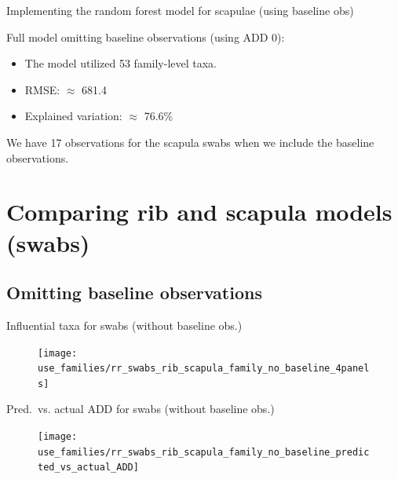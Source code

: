 \documentclass{beamer}
\begin{document}
\begin{frame}{Implementing the random forest model for scapulae (using baseline obs)}

  \noindent Full model omitting baseline observations (using ADD 0):
  \begin{itemize}
    \item The model utilized 53 family-level taxa. 
    \item RMSE: $\approx$ 681.4
    \item Explained variation: $\approx$ 76.6\%
  \end{itemize}
  \vspace{0.1in}

  \noindent We have 17 observations for the scapula swabs when we include the
  baseline observations.

\end{frame}



\section[Swabs from ribs and scapulae]{Comparing rib and scapula models (swabs)}


\subsection[No baseline]{Omitting baseline observations}

\begin{frame}{Influential taxa for swabs (without baseline obs.)}

  \begin{center}
    \begin{figure}
      \texttt{[image: use\_families/rr\_swabs\_rib\_scapula\_family\_no\_baseline\_4panels]}
    \end{figure}
  \end{center}

\end{frame}


\begin{frame}{Pred.\ vs. actual ADD for swabs (without baseline obs.)}

  \begin{center}
    \begin{figure}
      \texttt{[image: use\_families/rr\_swabs\_rib\_scapula\_family\_no\_baseline\_predicted\_vs\_actual\_ADD]}
    \end{figure}
  \end{center}

\end{frame}
\end{document}
